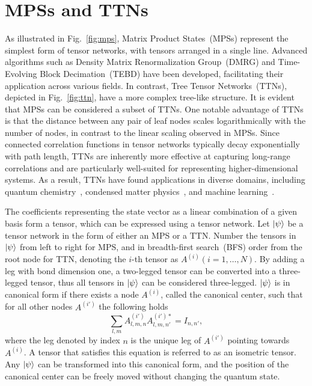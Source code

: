 \documentclass[12pt,dvipdfmx,twoside,openright]{report}
\begin{document}
\section{MPSs and TTNs}
As illustrated in Fig.~\ref{fig:mps}, Matrix Product States~(MPSs) represent the simplest form of tensor networks, with tensors arranged in a single line. 
Advanced algorithms such as Density Matrix Renormalization Group~(DMRG) and Time-Evolving Block Decimation~(TEBD) have been developed, facilitating their application across various fields. 
In contrast, Tree Tensor Networks~(TTNs), depicted in Fig.~\ref{fig:ttn}, have a more complex tree-like structure.
It is evident that MPSs can be considered a subset of TTNs.
One notable advantage of TTNs is that the distance between any pair of leaf nodes scales logarithmically with the number of nodes, in contrast to the linear scaling observed in MPSs. 
Since connected correlation functions in tensor networks typically decay exponentially with path length, TTNs are inherently more effective at capturing long-range correlations and are particularly well-suited for representing higher-dimensional systems. 
As a result, TTNs have found applications in diverse domains, including quantum chemistry~\cite{chemical1,chemical2}, condensed matter physics~\cite{condmat1,condmat2,condmat3}, and machine learning~\cite{ml1,ml2}.

The coefficients representing the state vector as a linear combination of a given basis form a tensor, which can be expressed using a tensor network.
Let $\ket{\psi}$ be a tensor network in the form of either an MPS or a TTN.
Number the tensors in $\ket{\psi}$ from left to right for MPS, and in breadth-first search~(BFS) order from the root node for TTN, denoting the $i$-th tensor as $A^{(i)} (i=1,\dots,N)$.
By adding a leg with bond dimension one, a two-legged tensor can be converted into a three-legged tensor, thus all tensors in $\ket{\psi}$ can be considered three-legged.
$\ket{\psi}$ is in canonical form if there exists a node $A^{(i)}$, called the canonical center, such that for all other nodes $A^{(i')}$ the following holds
\begin{equation}
    \sum_{l,m}A^{(i')}_{l,m,n}A^{(i')*}_{l,m,n'}=I_{n,n'},
\end{equation}
where the leg denoted by index $n$ is the unique leg of $A^{(i')}$ pointing towards $A^{(i)}$.
A tensor that satisfies this equation is referred to as an isometric tensor.
Any $\ket{\psi}$ can be transformed into this canonical form, and the position of the canonical center can be freely moved without changing the quantum state.
\end{document}
